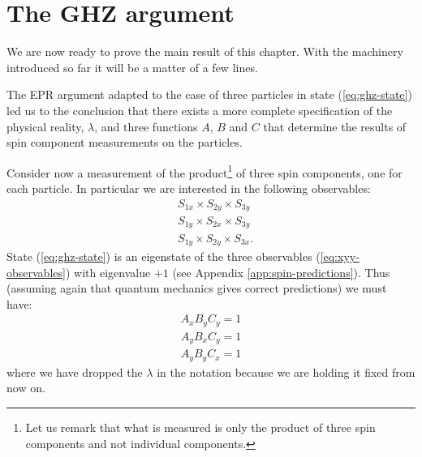 \section{The GHZ argument}
\label{sec:ghz-argument}
We are now ready to prove the main result of this chapter. With the machinery introduced so far it will be a matter of a few lines.

The EPR argument adapted to the case of three particles in state (\ref{eq:ghz-state}) led us to the conclusion that there exists a more complete specification of the physical reality, $\lambda$, and three functions $A$, $B$ and $C$ that determine the results of spin component measurements on the particles.

Consider now a measurement of the product\footnote{Let us remark that what is measured is only the product of three spin components and not individual components.} of three spin components, one for each particle. In particular we are interested in the following observables:
\begin{equation}
  \begin{split}
    &S_{1x} \times S_{2y} \times S_{3y}\\
    &S_{1y} \times S_{2x} \times S_{3y}\\
    &S_{1y} \times S_{2y} \times S_{3x}.
  \end{split}
  \label{eq:xyy-observables}
\end{equation}
State (\ref{eq:ghz-state}) is an eigenstate of the three observables (\ref{eq:xyy-observables}) with eigenvalue $+ 1$ (see Appendix \ref{app:spin-predictions}). Thus (assuming again that quantum mechanics gives correct predictions) we must have:%
\begin{equation}
  \begin{split}
    A_x B_y C_y = 1\\
    A_y B_x C_y = 1\\
    A_y B_y C_x = 1
  \end{split}
  \label{eq:xyy-local-realist-results}
\end{equation}
where we have dropped the $\lambda$ in the notation because we are holding it fixed from now on.

